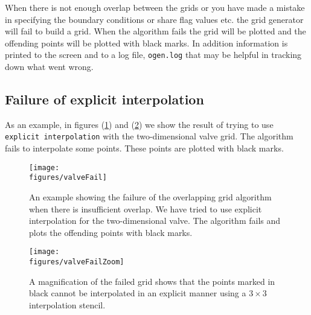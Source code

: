 \documentclass[xcolor=rgb,svgnames,dvipsnames]{article}
\newcommand{\figures}{../fig}
\begin{document}
When there is not enough overlap between the grids or you have made a
mistake in specifying the boundary conditions or share flag values
etc. the grid generator will fail to build a grid. When the algorithm
fails the grid will be plotted and the offending points will be
plotted with black marks. In addition information is printed to the
screen and to a log file, {\tt ogen.log} that may be helpful in tracking down what
went wrong.

\subsection{Failure of explicit interpolation}

As an example, in figures (\ref{fig:valveFail}) and  (\ref{fig:valveFailZoom})
we show the result of trying
to use {\tt explicit interpolation} with the two-dimensional valve grid. The algorithm fails
to interpolate some points. These points are plotted with black marks.

\begin{figure}[hbt]
  \begin{center}
   \texttt{[image: \\figures/valveFail]}
  \caption{An example showing the failure of the overlapping grid algorithm when there is insufficient 
     overlap. We have tried to use explicit interpolation for the two-dimensional valve. The algorithm
      fails and plots the offending points with black marks.} \label{fig:valveFail}
  \end{center}
\end{figure}
\begin{figure}[hbt]
  \begin{center}
   \texttt{[image: \\figures/valveFailZoom]}
  \caption{A magnification of the failed grid shows that the points marked in black cannot be interpolated
     in an explicit manner using a $3\times3$ interpolation stencil.} \label{fig:valveFailZoom}
  \end{center}
\end{figure}
\end{document}
